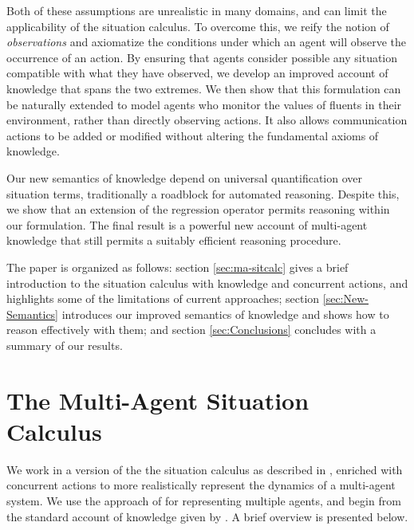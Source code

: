 \documentclass[letterpaper]{article}
\begin{document}
Both of these assumptions are unrealistic in many domains, and can
limit the applicability of the situation calculus. To overcome this,
we reify the notion of \emph{observations} and axiomatize the conditions
under which an agent will observe the occurrence of an action. By
ensuring that agents consider possible any situation compatible with
what they have observed, we develop an improved account of knowledge
that spans the two extremes. We then show that this formulation can
be naturally extended to model agents who monitor the values of fluents
in their environment, rather than directly observing actions. It also
allows communication actions to be added or modified without altering
the fundamental axioms of knowledge.

Our new semantics of knowledge depend on universal quantification
over situation terms, traditionally a roadblock for automated reasoning.
Despite this, we show that an extension of the regression operator
permits reasoning within our formulation. The final result is a powerful
new account of multi-agent knowledge that still permits a suitably
efficient reasoning procedure.

The paper is organized as follows: section \ref{sec:ma-sitcalc} gives
a brief introduction to the situation calculus with knowledge and
concurrent actions, and highlights some of the limitations of current
approaches; section \ref{sec:New-Semantics} introduces our improved
semantics of knowledge and shows how to reason effectively with them;
and section \ref{sec:Conclusions} concludes with a summary of our
results.


\section{The Multi-Agent Situation Calculus\label{sec:ma-sitcalc}}

We work in a version of the the situation calculus as described in
\cite{pirri99contributions_sitcalc}, enriched with concurrent actions
\cite{reiter96sc_nat_conc} to more realistically represent the dynamics
of a multi-agent system. We use the approach of \cite{shapiro01casl_feat_inter}
for representing multiple agents, and begin from the standard account
of knowledge given by \cite{scherl03sc_knowledge,scherl03conc_knowledge}.
A brief overview is presented below.
\end{document}
